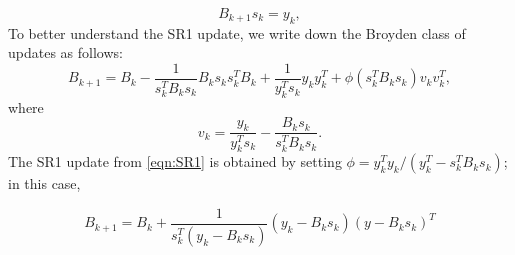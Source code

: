 \begin{equation*}
	B_{k+1}s_k = y_k,
\end{equation*}
To better understand the SR1 update, we write down the Broyden class of updates  as follows:
\begin{equation}\label{eqn:SR1}
	B_{k+1} = B_k - \frac{1}{s_k^TB_ks_k}B_ks_ks_k^TB_k + \frac{1}{y_k^Ts_k}y_ky_k^T + \phi(s_k^TB_k s_k)v_kv_k^T,
\end{equation}
where
\begin{equation*}
	v_k = \frac{y_k}{y_k^Ts_k} - \frac{B_ks_k}{s_k^TB_ks_k}.
\end{equation*}
The SR1 update from \eqref{eqn:SR1} is obtained by setting $\phi = y_k^Ty_k/(y_k^T - s_k^TB_ks_k)$; in this case,

\begin{equation*}
	B_{k+1} = B_k + \frac{1}{s_k^T(y_k - B_ks_k)}(y_k -B_ks_k)(y-B_ks_k)^T
\end{equation*}